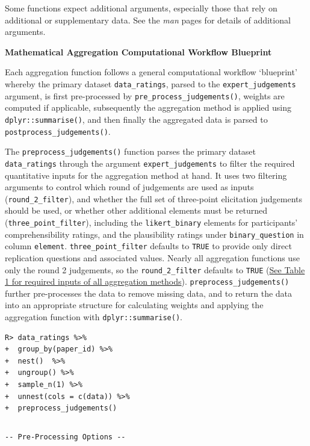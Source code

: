 \documentclass[article]{jss}
\begin{document}
\begin{tcolorbox}[enhanced jigsaw, breakable, opacityback=0, left=2mm, toprule=.15mm, rightrule=.15mm, bottomrule=.15mm, colframe=quarto-callout-color-frame, arc=.35mm, leftrule=.75mm, colback=white]
Some functions expect additional arguments, especially those that rely
on additional or supplementary data. See the \emph{man} pages for
details of additional arguments.

\textbf{Mathematical Aggregation Computational Workflow Blueprint}

Each aggregation function follows a general computational workflow
`blueprint' whereby the primary dataset \texttt{data\_ratings}, parsed
to the \texttt{expert\_judgements} argument, is first pre-processed by
\texttt{pre\_process\_judgements()}, weights are computed if applicable,
subsequently the aggregation method is applied using
\texttt{dplyr::summarise()}, and then finally the aggregated data is
parsed to \texttt{postprocess\_judgements()}.

The \texttt{preprocess\_judgements()} function parses the primary
dataset \texttt{data\_ratings} through the argument
\texttt{expert\_judgements} to filter the required quantitative inputs
for the aggregation method at hand. It uses two filtering arguments to
control which round of judgements are used as inputs
(\texttt{round\_2\_filter}), and whether the full set of three-point
elicitation judgements should be used, or whether other additional
elements must be returned (\texttt{three\_point\_filter}), including the
\texttt{likert\_binary} elements for participants' comprehensibility
ratings, and the plausibility ratings under \texttt{binary\_question} in
column \texttt{element}. \texttt{three\_point\_filter} defaults to
\texttt{TRUE} to provide only direct replication questions and
associated values. Nearly all aggregation functions use only the round 2
judgements, so the \texttt{round\_2\_filter} defaults to \texttt{TRUE}
(\protect\hyperlink{table1}{See Table 1 for required inputs of all
aggregation methods}). \texttt{preprocess\_judgements()} further
pre-processes the data to remove missing data, and to return the data
into an appropriate structure for calculating weights and applying the
aggregation function with \texttt{dplyr::summarise()}.

\begin{verbatim}
R> data_ratings %>% 
+  group_by(paper_id) %>% 
+  nest()  %>% 
+  ungroup() %>% 
+  sample_n(1) %>% 
+  unnest(cols = c(data)) %>% 
+  preprocess_judgements()
\end{verbatim}

\begin{verbatim}
\end{verbatim}

\begin{verbatim}
-- Pre-Processing Options --
\end{verbatim}


\end{tcolorbox}
\end{document}

